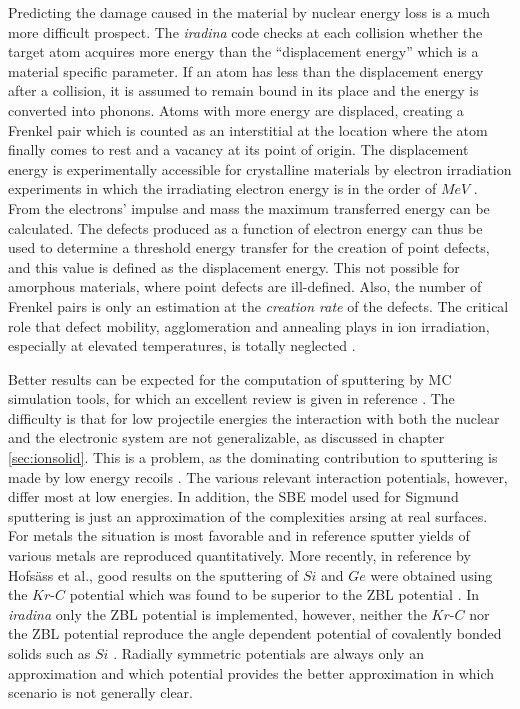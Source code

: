 Predicting the damage caused in the material by nuclear energy loss is a much more difficult prospect. The \emph{iradina} code checks at each collision whether the target atom acquires more energy than the ``displacement energy'' which is a material specific parameter. If an atom has less than the displacement energy after a collision, it is assumed to remain bound in its place and the energy is converted into phonons. Atoms with more energy are displaced, creating a Frenkel pair which is counted as an interstitial at the location where the atom finally comes to rest and a vacancy at its point of origin. The displacement energy is experimentally accessible for crystalline materials by electron irradiation experiments in which the irradiating electron energy is in the order of $MeV$ \cite{corbett_production_1965}. From the electrons' impulse and mass the maximum transferred energy can be calculated. The defects produced as a function of electron energy can thus be used to determine a threshold energy transfer for the creation of point defects, and this value is defined as the displacement energy. This not possible for amorphous materials, where point defects are ill-defined. Also, the number of Frenkel pairs is only an estimation at the \emph{creation rate} of the defects. The critical role that defect mobility, agglomeration and annealing plays in ion irradiation, especially at elevated temperatures, is totally neglected \cite{pelaz_ion-beam-induced_2004,nordlund_correction_2014}.

Better results can be expected for the computation of sputtering by MC simulation tools, for which an excellent review is given in reference \cite{biersack_computer_1987}. The difficulty is that for low projectile energies the interaction with both the nuclear and the electronic system are not generalizable, as discussed in chapter \ref{sec:ionsolid}. This is a problem, as the dominating contribution to sputtering is made by low energy recoils \cite{thompson_energy_1968}. The various relevant interaction potentials, however, differ most at low energies. In addition, the SBE model used for Sigmund sputtering is just an approximation of the complexities arsing at real surfaces. For metals the situation is most favorable and in reference \cite{biersack_computer_1987} sputter yields of various metals are reproduced quantitatively. More recently, in reference \cite{hofsass_simulation_2014} by Hofsäss et al., good results on the sputtering of $Si$ and $Ge$ were obtained using the $Kr$-$C$ \cite{wilson_calculations_1977} potential which was found to be superior to the ZBL potential \cite{ziegler_stopping_1985}. In \emph{iradina} only the ZBL potential is implemented, however, neither the $Kr$-$C$ nor the ZBL potential reproduce the angle dependent potential of covalently bonded solids such as $Si$ \cite{stillinger_computer_1985,tersoff_new_1988}. Radially symmetric potentials are always only an approximation and which potential provides the better approximation in which scenario is not generally clear.

